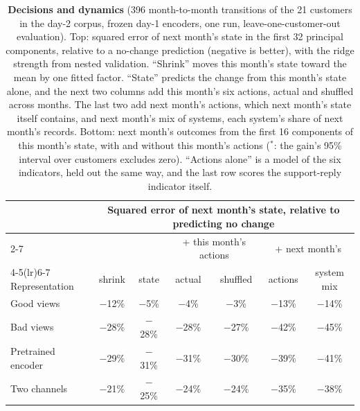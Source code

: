 \documentclass[11pt]{article}
\begin{document}
\begin{table}[h]
\centering
\small
\caption{\textbf{Decisions and dynamics} (396 month-to-month transitions of the 21 customers in the day-2 corpus, frozen day-1 encoders, one run, leave-one-customer-out evaluation). Top: squared error of next month's state in the first 32 principal components, relative to a no-change prediction (negative is better), with the ridge strength from nested validation. ``Shrink'' moves this month's state toward the mean by one fitted factor. ``State'' predicts the change from this month's state alone, and the next two columns add this month's six actions, actual and shuffled across months. The last two add next month's actions, which next month's state itself contains, and next month's mix of systems, each system's share of next month's records. Bottom: next month's outcomes from the first 16 components of this month's state, with and without this month's actions ($^{*}$: the gain's 95\% interval over customers excludes zero). ``Actions alone'' is a model of the six indicators, held out the same way, and the last row scores the support-reply indicator itself.}
\label{tab:actions}
\setlength{\tabcolsep}{4.5pt}\begin{tabular}{lcccccc}
\toprule
& \multicolumn{6}{c}{Squared error of next month's state, relative to predicting no change} \\
\cmidrule(lr){2-7}
& & & \multicolumn{2}{c}{+ this month's actions} & \multicolumn{2}{c}{+ next month's} \\
\cmidrule(lr){4-5}\cmidrule(lr){6-7}
Representation & shrink & state & actual & shuffled & actions & system mix \\
\midrule
Good views & $-$12\% & $-$5\% & $-$4\% & $-$3\% & $-$13\% & $-$14\% \\
Bad views & $-$28\% & $-$28\% & $-$28\% & $-$27\% & $-$42\% & $-$45\% \\
Pretrained encoder & $-$29\% & $-$31\% & $-$31\% & $-$30\% & $-$39\% & $-$41\% \\
Two channels & $-$21\% & $-$25\% & $-$24\% & $-$24\% & $-$35\% & $-$38\% \\
\bottomrule
\end{tabular}

\vspace{8pt}


\end{table}
\end{document}
